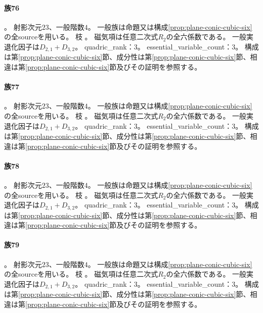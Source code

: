 \paragraph{族76}\label{catalogue:R4_PLANE_CONIC_CUBIC_CUSP_OUTSIDE_3_23}
。
射影次元$23$、一般階数$4$。
一般族は命題又は構成\ref{prop:plane-conic-cubic-six}の全sourceを用いる。
枝 。
磁気項は任意二次式$R_2$の全六係数である。
一般実退化因子は$D_{2,1}+D_{3,2}$。
quadric\_rank：3。
essential\_variable\_count：3。
構成は第\ref{prop:plane-conic-cubic-six}節、成分性は第\ref{prop:plane-conic-cubic-six}節、相違は第\ref{prop:plane-conic-cubic-six}節及びその証明を参照する。

\paragraph{族77}\label{catalogue:R4_PLANE_CONIC_CUBIC_CUSP_AT_CUSP_2_23}
。
射影次元$23$、一般階数$4$。
一般族は命題又は構成\ref{prop:plane-conic-cubic-six}の全sourceを用いる。
枝 。
磁気項は任意二次式$R_2$の全六係数である。
一般実退化因子は$D_{2,1}+D_{3,2}$。
quadric\_rank：3。
essential\_variable\_count：3。
構成は第\ref{prop:plane-conic-cubic-six}節、成分性は第\ref{prop:plane-conic-cubic-six}節、相違は第\ref{prop:plane-conic-cubic-six}節及びその証明を参照する。

\paragraph{族78}\label{catalogue:R4_PLANE_CONIC_CUBIC_CUSP_AT_CUSP_3_23}
。
射影次元$23$、一般階数$4$。
一般族は命題又は構成\ref{prop:plane-conic-cubic-six}の全sourceを用いる。
枝 。
磁気項は任意二次式$R_2$の全六係数である。
一般実退化因子は$D_{2,1}+D_{3,2}$。
quadric\_rank：3。
essential\_variable\_count：3。
構成は第\ref{prop:plane-conic-cubic-six}節、成分性は第\ref{prop:plane-conic-cubic-six}節、相違は第\ref{prop:plane-conic-cubic-six}節及びその証明を参照する。

\paragraph{族79}\label{catalogue:R4_PLANE_CONIC_CUBIC_NODE_SMOOTH_CONTACT_23}
。
射影次元$23$、一般階数$4$。
一般族は命題又は構成\ref{prop:plane-conic-cubic-six}の全sourceを用いる。
枝 。
磁気項は任意二次式$R_2$の全六係数である。
一般実退化因子は$D_{2,1}+D_{3,2}$。
quadric\_rank：3。
essential\_variable\_count：3。
構成は第\ref{prop:plane-conic-cubic-six}節、成分性は第\ref{prop:plane-conic-cubic-six}節、相違は第\ref{prop:plane-conic-cubic-six}節及びその証明を参照する。

